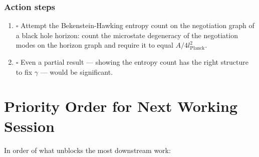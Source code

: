 \documentclass[11pt,letterpaper]{article}
\begin{document}
\subsubsection{Action steps}
\label{sec:orge8ab0ea}

\begin{enumerate}
\item{$\square$} Attempt the Bekenstein-Hawking entropy count on the negotiation graph of
a black hole horizon: count the microstate degeneracy of the negotiation modes
on the horizon graph and require it to equal \(A/4l_\text{Planck}^2\).
\item{$\square$} Even a partial result --- showing the entropy count has the right
structure to fix \(\gamma\) --- would be significant.
\end{enumerate}

\section{Priority Order for Next Working Session}
\label{sec:org83a295b}

In order of what unblocks the most downstream work:
\end{document}
